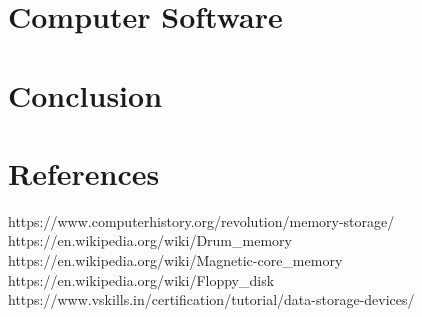 \documentclass{article}
\begin{document}
\section{Computer Software}

\section{Conclusion}

\section{References}
https://www.computerhistory.org/revolution/memory-storage/\\
https://en.wikipedia.org/wiki/Drum\_memory\\
https://en.wikipedia.org/wiki/Magnetic-core\_memory\\
https://en.wikipedia.org/wiki/Floppy\_disk\\
https://www.vskills.in/certification/tutorial/data-storage-devices/\\
\end{document}
